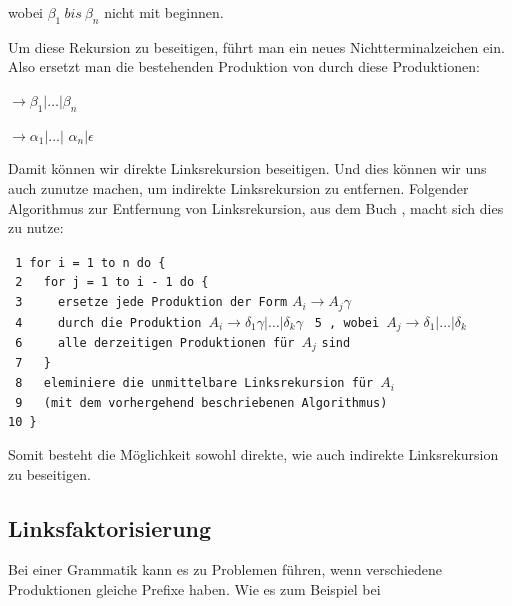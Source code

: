 \noindent wobei $\beta_1\ bis\ \beta_n$ nicht mit 
beginnen.\vspace{10pt}

\noindent Um diese Rekursion zu beseitigen, führt man ein neues
Nichtterminalzeichen  ein. Also ersetzt man die
bestehenden Produktion von
 durch diese Produktionen:\vspace{10pt}

 $\to \beta_1 | \ldots | \beta_n$

 $\to \alpha_1$$|\ldots|$
$\alpha_n$$|\epsilon$\vspace{10pt}

\noindent Damit können wir direkte Linksrekursion beseitigen. Und dies können wir
uns auch zunutze machen, um indirekte Linksrekursion zu entfernen. Folgender
Algorithmus zur Entfernung von Linksrekursion, aus dem Buch \cite{Compilers},
macht sich dies zu nutze:\vspace{10pt}

\noindent
\verb| 1 for i = 1 to n do {|\\
\verb| 2   for j = 1 to i - 1 do {|\\
\verb| 3     ersetze jede Produktion der Form| $A_i \to A_j \gamma$ \verb| |\\ 
\verb| 4     durch die Produktion |$A_i \to \delta_1\gamma|\ldots|\delta_k\gamma$
\verb| 5 , wobei |$A_j \to \delta_1|\ldots|\delta_k$\\ 
\verb| 6     alle derzeitigen Produktionen für |$A_j$ \verb|sind|\\ 
\verb| 7   }|\\
\verb| 8   eleminiere die unmittelbare Linksrekursion für |$A_i$\\
\verb| 9   (mit dem vorhergehend beschriebenen Algorithmus)|\\
\verb|10 }|
\vspace{10pt}

Somit besteht die Möglichkeit sowohl direkte, wie auch indirekte Linksrekursion
zu beseitigen.\vspace{10pt}

\subsection{Linksfaktorisierung}

Bei einer Grammatik kann es zu Problemen führen, wenn verschiedene Produktionen
gleiche Prefixe haben. Wie es zum Beispiel bei \vspace{10pt}

